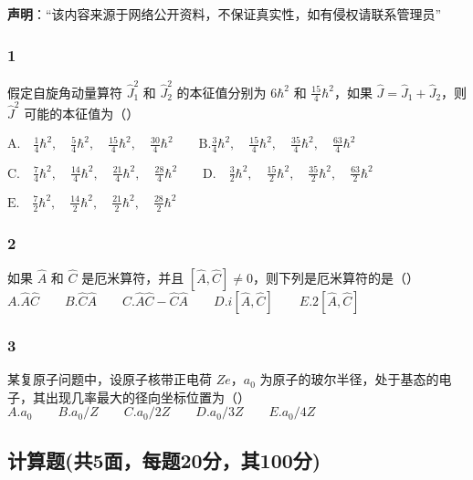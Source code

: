 
\textbf{声明}：“该内容来源于网络公开资料，不保证真实性，如有侵权请联系管理员”

\subsubsection{1}
假定自旋角动量算符 $\hat{J}_1^2$ 和 $\hat{J}_2^2$ 的本征值分别为 $6\hbar^2$ 和 $\frac{15}{4}\hbar^2$，如果 $\hat{J} = \hat{J}_1 + \hat{J}_2$，则 $\hat{J}^2$ 可能的本征值为（）

$\text{A.} \quad \frac{1}{4}\hbar^2, \quad \frac{5}{4}\hbar^2, \quad \frac{15}{4}\hbar^2, \quad \frac{30}{4}\hbar^2\qquad \text{B.}\frac{3}{4}\hbar^2, \quad \frac{15}{4}\hbar^2, \quad \frac{35}{4}\hbar^2, \quad \frac{63}{4}\hbar^2$

$\text{C.} \quad \frac{7}{4}\hbar^2, \quad \frac{14}{4}\hbar^2, \quad \frac{21}{4}\hbar^2, \quad \frac{28}{4}\hbar^2\qquad\text{D.} \quad \frac{3}{2}\hbar^2, \quad \frac{15}{2}\hbar^2, \quad \frac{35}{2}\hbar^2, \quad \frac{63}{2}\hbar^2$

$\text{E.} \quad \frac{7}{2}\hbar^2, \quad \frac{14}{2}\hbar^2, \quad \frac{21}{2}\hbar^2, \quad \frac{28}{2}\hbar^2$
\subsubsection{2}
如果 $\hat{A}$ 和 $\hat{C}$ 是厄米算符，并且 $[\hat{A}, \hat{C}] \neq 0$，则下列是厄米算符的是（）\\
$A. \hat{A}\hat{C}\qquad B. \hat{C}\hat{A}\qquad C. \hat{A}\hat{C} - \hat{C}\hat{A}\qquad D. i[\hat{A}, \hat{C}]\qquad E. 2[\hat{A}, \hat{C}]$
\subsubsection{3}
某复原子问题中，设原子核带正电荷 $Ze$，$a_0$ 为原子的玻尔半径，处于基态的电子，其出现几率最大的径向坐标位置为（）\\
$A. a_0\qquad B. a_0/Z \qquad C. a_0/2Z\qquad D. a_0/3Z\qquad E. a_0/4Z$
\subsection{计算题(共5面，每题20分，其100分)}
